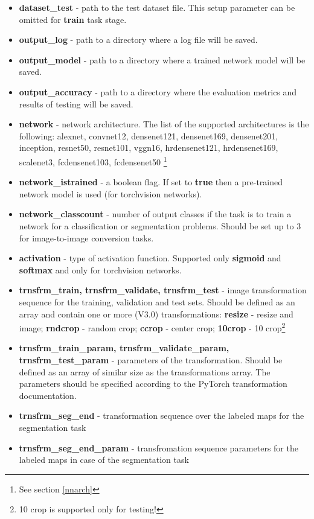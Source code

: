 \documentclass[a4paper, 11pt]{article}
\begin{document}
\begin{itemize}
    \item \textbf{dataset\_test} - path to the test dataset file. This setup parameter can be omitted for \textbf{train} task stage.
    
    \item \textbf{output\_log} - path to a directory where a log file will be saved.
    
    \item \textbf{output\_model} - path to a directory where a trained network model will be saved.
    
    \item \textbf{output\_accuracy} - path to a directory where the evaluation metrics and results of testing will be saved.
    
    \item \textbf{network} - network architecture. The list of the supported architectures is the following:
    alexnet, convnet12, densenet121, densenet169, densenet201, inception, resnet50, resnet101, vggn16, hrdensenet121, hrdensenet169, scalenet3, fcdensenet103, fcdensenet50 \footnote{See section \ref{nnarch}}
    
    \item \textbf{network\_istrained} - a boolean flag. If set to \textbf{true} then a pre-trained network model is used (for torchvision networks). 
    
    \item \textbf{network\_classcount} - number of output classes if the task is to train a network for a classification or segmentation problems. Should be set up to 3 for image-to-image conversion tasks.
    
    \item \textbf{activation} - type of activation function. Supported only \textbf{sigmoid} and \textbf{softmax} and only for torchvision networks. 
    
    \item \textbf{trnsfrm\_train, trnsfrm\_validate, trnsfrm\_test} - image transformation sequence for the training, validation and test sets. Should be defined as an array and contain one or more (V3.0) transformations: \textbf{resize} - resize and image; \textbf{rndcrop} - random crop; \textbf{ccrop} - center crop; \textbf{10crop} - 10 crop\footnote{10 crop is supported only for testing!}
    
    \item \textbf{trnsfrm\_train\_param, trnsfrm\_validate\_param, trnsfrm\_test\_param} - parameters of the transformation. Should be defined as an array of similar size as the transformations array. The parameters should be specified according to the PyTorch transformation documentation.
	
	\item \textbf{trnsfrm\_seg\_end} - transformation sequence over the labeled maps for the segmentation task
	
	\item \textbf {trnsfrm\_seg\_end\_param} - transfromation sequence parameters for the labeled maps in case of the segmentation task
    
\end{itemize}
\end{document}
